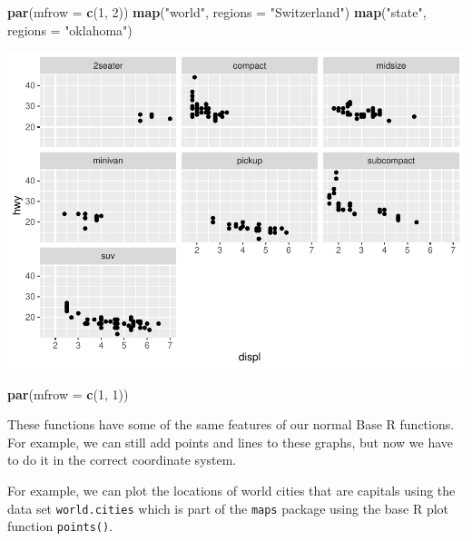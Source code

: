 \documentclass[
]{book}
\newenvironment{Shaded}{\begin{snugshade}}{\end{snugshade}}
\newcommand{\DataTypeTok}[1]{\textcolor[rgb]{0.13,0.29,0.53}{#1}}
\newcommand{\DecValTok}[1]{\textcolor[rgb]{0.00,0.00,0.81}{#1}}
\newcommand{\KeywordTok}[1]{\textcolor[rgb]{0.13,0.29,0.53}{\textbf{#1}}}
\newcommand{\NormalTok}[1]{#1}
\newcommand{\OperatorTok}[1]{\textcolor[rgb]{0.81,0.36,0.00}{\textbf{#1}}}
\newcommand{\StringTok}[1]{\textcolor[rgb]{0.31,0.60,0.02}{#1}}
\begin{document}
\begin{Shaded}
\begin{Highlighting}[]
\KeywordTok{par}\NormalTok{(}\DataTypeTok{mfrow =} \KeywordTok{c}\NormalTok{(}\DecValTok{1}\NormalTok{, }\DecValTok{2}\NormalTok{))}
\KeywordTok{map}\NormalTok{(}\StringTok{"world"}\NormalTok{, }\DataTypeTok{regions =} \StringTok{"Switzerland"}\NormalTok{)}
\KeywordTok{map}\NormalTok{(}\StringTok{"state"}\NormalTok{, }\DataTypeTok{regions =} \StringTok{"oklahoma"}\NormalTok{)}
\end{Highlighting}
\end{Shaded}

\includegraphics{_main_files/figure-latex/unnamed-chunk-257-1.pdf}

\begin{Shaded}
\begin{Highlighting}[]
\KeywordTok{par}\NormalTok{(}\DataTypeTok{mfrow =} \KeywordTok{c}\NormalTok{(}\DecValTok{1}\NormalTok{, }\DecValTok{1}\NormalTok{))}
\end{Highlighting}
\end{Shaded}

These functions have some of the same features of our normal Base R functions. For example, we can still add points and lines to these graphs, but now we have to do it in the correct coordinate system.

For example, we can plot the locations of world cities that are capitals using the data set \texttt{world.cities} which is part of the \texttt{maps} package using the base R plot function \texttt{points()}.

\begin{Shaded}
\end{Shaded}
\end{document}
